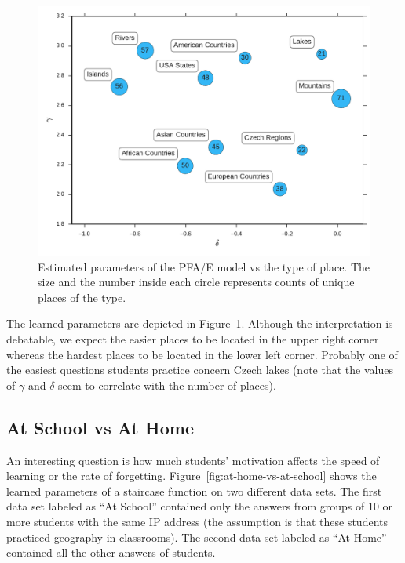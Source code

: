 \begin{figure}[htbp]
  \centering
  \includegraphics[width=\textwidth]{img/gamma-vs-delta-vs-size}
  \caption{Estimated parameters of the PFA/E model vs the type of place. The size and the number inside each circle represents counts of unique places of the type.}
  \label{fig:gamma-vs-delta-vs-size}
\end{figure}

The learned parameters are depicted in Figure~\ref{fig:gamma-vs-delta-vs-size}. Although the interpretation is debatable, we expect the easier places to be located in the upper right corner whereas the hardest places to be located in the lower left corner. Probably one of the easiest questions students practice concern Czech lakes (note that the values of $\gamma$ and $\delta$ seem to correlate with the number of places).

\subsection{At School vs At Home}

An interesting question is how much students' motivation affects the speed of learning or the rate of forgetting. Figure~\ref{fig:at-home-vs-at-school} shows the learned parameters of a staircase function on two different data sets. The first data set labeled as ``At School'' contained only the answers from groups of 10 or more students with the same IP address (the assumption is that these students practiced geography in classrooms). The second data set labeled as ``At Home'' contained all the other answers of students.

